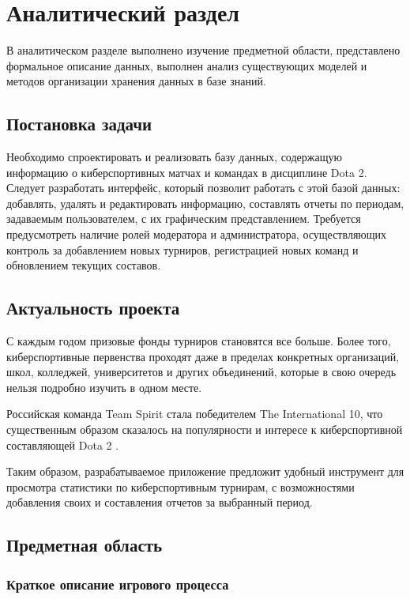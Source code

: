 \chapter{Аналитический раздел}

В аналитическом разделе выполнено изучение предметной области, представлено формальное описание данных, выполнен анализ существующих моделей и методов организации хранения данных в базе знаний.

\section{Постановка задачи}

Необходимо спроектировать и реализовать базу данных, содержащую информацию о киберспортивных матчах и командах в дисциплине Dota 2. Следует разработать интерфейс, который позволит работать с этой базой данных: добавлять, удалять и редактировать информацию, составлять отчеты по периодам, задаваемым пользователем, с их графическим представлением. Требуется предусмотреть наличие ролей модератора и администратора, осуществляющих контроль за добавлением новых турниров, регистрацией новых команд и обновлением текущих составов.

\section{Актуальность проекта}

С каждым годом призовые фонды турниров становятся все больше. Более того, киберспортивные первенства проходят даже в пределах конкретных организаций, школ, колледжей, университетов и других объединений, которые в свою очередь нельзя подробно изучить в одном месте.

Российская команда Team Spirit стала победителем The International 10, что существенным образом сказалось на популярности и интересе к киберспортивной составляющей Dota 2 \cite{teamspirit}.

Таким образом, разрабатываемое приложение предложит удобный инструмент для просмотра статистики по киберспортивным турнирам, с возможностями добавления своих и составления отчетов за выбранный период.

\section{Предметная область}

\subsection{Краткое описание игрового процесса}

